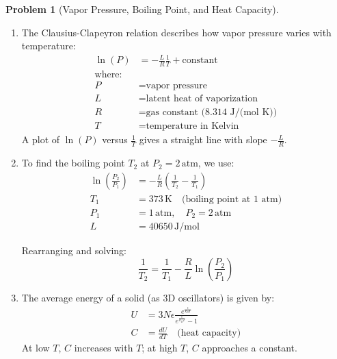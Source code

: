 \documentclass[12pt]{article}
\theoremstyle{definition} %
\newtheorem{problem}{Problem}
\theoremstyle{plain} %
\begin{document}
\begin{problem}[Vapor Pressure, Boiling Point, and Heat Capacity]
    \noindent
    \begin{enumerate}
        \item 
        The Clausius-Clapeyron relation describes how vapor pressure varies with temperature:
        \begin{align*}
        \ln(P) &= -\frac{L}{R} \frac{1}{T} + \text{constant} \\
        \text{where:} \\
        P &= \text{vapor pressure} \\
        L &= \text{latent heat of vaporization} \\
        R &= \text{gas constant (8.314 J/(mol K))} \\
        T &= \text{temperature in Kelvin}
        \end{align*}
        A plot of \( \ln(P) \) versus \( \frac{1}{T} \) gives a straight line with slope \( -\frac{L}{R} \).

        \item 
        To find the boiling point \( T_2 \) at \( P_2 = 2 \, \text{atm} \), we use:
        \begin{align*}
        \ln\left(\frac{P_2}{P_1}\right) &= -\frac{L}{R} \left( \frac{1}{T_2} - \frac{1}{T_1} \right) \\
        T_1 &= 373 \, \text{K} \quad \text{(boiling point at 1 atm)} \\
        P_1 &= 1 \, \text{atm}, \quad P_2 = 2 \, \text{atm} \\
        L &= 40650 \, \text{J/mol}
        \end{align*}

        Rearranging and solving:
        $$
        \frac{1}{T_2} = \frac{1}{T_1} - \frac{R}{L} \ln\left(\frac{P_2}{P_1}\right)
        $$

        \item 
        The average energy of a solid (as 3D oscillators) is given by:
        \begin{align*}
        U &= 3N \epsilon \frac{e^{\frac{\epsilon}{k_B T}}}{e^{\frac{\epsilon}{k_B T}} - 1} \\
        C &= \frac{dU}{dT} \quad \text{(heat capacity)}
        \end{align*}
        At low \( T \), \( C \) increases with \( T \); at high \( T \), \( C \) approaches a constant.
    \end{enumerate}
\end{problem}
\end{document}
